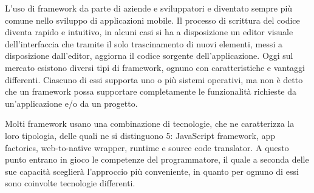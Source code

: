 L'uso di framework da parte di aziende e sviluppatori e diventato sempre più comune nello sviluppo di applicazioni mobile. Il processo di scrittura del codice diventa rapido e intuitivo, in alcuni casi si ha a disposizione un editor visuale dell'interfaccia che tramite il solo trascinamento di nuovi elementi, messi a disposizione dall'editor, aggiorna il codice sorgente dell'applicazione.
Oggi sul mercato esistono diversi tipi di framework, ognuno con caratteristiche e vantaggi differenti. Ciascuno di essi supporta uno o più sistemi operativi, ma non è detto che un framework possa supportare completamente le funzionalità richieste da un'applicazione e/o da un progetto.

Molti framework usano una combinazione di tecnologie, che ne caratterizza la loro tipologia, delle quali ne si distinguono 5: JavaScript framework, app factories, web-to-native wrapper, runtime e source code translator. A questo punto entrano in gioco le competenze del programmatore, il quale a seconda delle sue capacità sceglierà l'approccio più conveniente, in quanto per ognuno di essi sono coinvolte tecnologie differenti.
\cite{ref:bsc_waldner}

